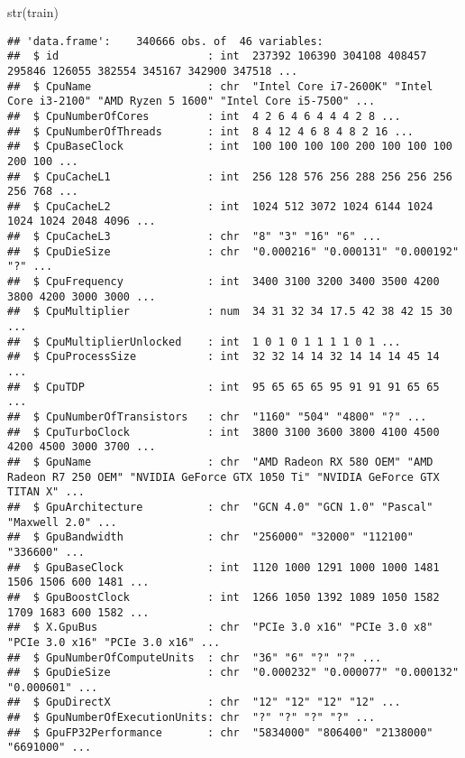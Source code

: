 \documentclass[
]{article}
\newenvironment{Shaded}{\begin{snugshade}}{\end{snugshade}}
\newcommand{\FunctionTok}[1]{\textcolor[rgb]{0.00,0.00,0.00}{#1}}
\newcommand{\NormalTok}[1]{#1}
\begin{document}
\begin{Shaded}
\begin{Highlighting}[]
\FunctionTok{str}\NormalTok{(train)}
\end{Highlighting}
\end{Shaded}

\begin{verbatim}
## 'data.frame':    340666 obs. of  46 variables:
##  $ id                       : int  237392 106390 304108 408457 295846 126055 382554 345167 342900 347518 ...
##  $ CpuName                  : chr  "Intel Core i7-2600K" "Intel Core i3-2100" "AMD Ryzen 5 1600" "Intel Core i5-7500" ...
##  $ CpuNumberOfCores         : int  4 2 6 4 6 4 4 4 2 8 ...
##  $ CpuNumberOfThreads       : int  8 4 12 4 6 8 4 8 2 16 ...
##  $ CpuBaseClock             : int  100 100 100 100 200 100 100 100 200 100 ...
##  $ CpuCacheL1               : int  256 128 576 256 288 256 256 256 256 768 ...
##  $ CpuCacheL2               : int  1024 512 3072 1024 6144 1024 1024 1024 2048 4096 ...
##  $ CpuCacheL3               : chr  "8" "3" "16" "6" ...
##  $ CpuDieSize               : chr  "0.000216" "0.000131" "0.000192" "?" ...
##  $ CpuFrequency             : int  3400 3100 3200 3400 3500 4200 3800 4200 3000 3000 ...
##  $ CpuMultiplier            : num  34 31 32 34 17.5 42 38 42 15 30 ...
##  $ CpuMultiplierUnlocked    : int  1 0 1 0 1 1 1 1 0 1 ...
##  $ CpuProcessSize           : int  32 32 14 14 32 14 14 14 45 14 ...
##  $ CpuTDP                   : int  95 65 65 65 95 91 91 91 65 65 ...
##  $ CpuNumberOfTransistors   : chr  "1160" "504" "4800" "?" ...
##  $ CpuTurboClock            : int  3800 3100 3600 3800 4100 4500 4200 4500 3000 3700 ...
##  $ GpuName                  : chr  "AMD Radeon RX 580 OEM" "AMD Radeon R7 250 OEM" "NVIDIA GeForce GTX 1050 Ti" "NVIDIA GeForce GTX TITAN X" ...
##  $ GpuArchitecture          : chr  "GCN 4.0" "GCN 1.0" "Pascal" "Maxwell 2.0" ...
##  $ GpuBandwidth             : chr  "256000" "32000" "112100" "336600" ...
##  $ GpuBaseClock             : int  1120 1000 1291 1000 1000 1481 1506 1506 600 1481 ...
##  $ GpuBoostClock            : int  1266 1050 1392 1089 1050 1582 1709 1683 600 1582 ...
##  $ X.GpuBus                 : chr  "PCIe 3.0 x16" "PCIe 3.0 x8" "PCIe 3.0 x16" "PCIe 3.0 x16" ...
##  $ GpuNumberOfComputeUnits  : chr  "36" "6" "?" "?" ...
##  $ GpuDieSize               : chr  "0.000232" "0.000077" "0.000132" "0.000601" ...
##  $ GpuDirectX               : chr  "12" "12" "12" "12" ...
##  $ GpuNumberOfExecutionUnits: chr  "?" "?" "?" "?" ...
##  $ GpuFP32Performance       : chr  "5834000" "806400" "2138000" "6691000" ...

\end{verbatim}
\end{document}
